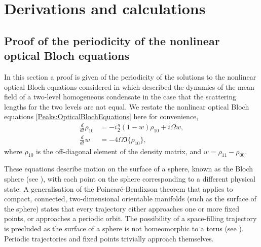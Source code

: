 \chapter{Derivations and calculations}
\label{MethodsAppendix}
\graphicspath{{Figures/MethodsAppendix/}{Figures/Common/}}


\section{Proof of the periodicity of the nonlinear optical Bloch equations}
\label{MethodsAppendix:OpticalBlochPeriodicityProof}
In this section a proof is given of the periodicity of the solutions to the nonlinear optical Bloch equations considered in  which described the dynamics of the mean field of a two-level homogeneous condensate in the case that the scattering lengths for the two levels are not equal. We restate the nonlinear optical Bloch equations \eqref{Peaks:OpticalBlochEquations} here for convenience,
\begin{subequations}
    \label{Peaks:OpticalBlochEquations}
    \begin{align}
        \frac{d}{dt}\rho_{10} &= -i\frac{g}{2} (1-w)\rho_{10} + i \Omega w,\\
        \frac{d }{dt}w &= -4 \Omega \Im\{\rho_{10}\},
    \end{align}
\end{subequations}
where $\rho_{10}$ is the off-diagonal element of the density matrix, and $w = \rho_{11} - \rho_{00}$.

These equations describe motion on the surface of a sphere, known as the Bloch sphere (see ), with each point on the sphere corresponding to a different physical state.  A generalisation of the Poincaré-Bendixson theorem that applies to compact, connected, two-dimensional orientable manifolds \citep{Schwartz:1963} (such as the surface of the sphere) states that every trajectory either approaches one or more fixed points, or approaches a periodic orbit.  The possibility of a space-filling trajectory is precluded as the surface of a sphere is not homeomorphic to a torus (see \citep{Schwartz:1963}).  Periodic trajectories and fixed points trivially approach themselves.

